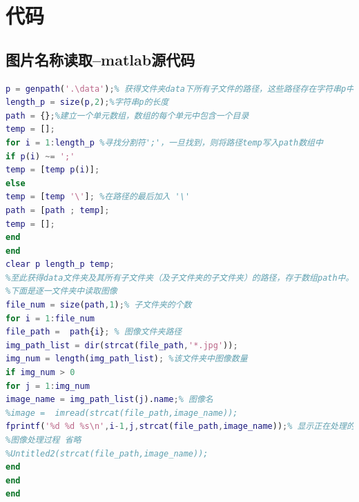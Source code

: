 \documentclass{whutmod}
\begin{document}
	\newpage
	\appendix %

\section{代码}
\subsection{图片名称读取--matlab源代码}
\begin{lstlisting}[language=matlab]
p = genpath('.\data');% 获得文件夹data下所有子文件的路径，这些路径存在字符串p中，以';'分割
length_p = size(p,2);%字符串p的长度
path = {};%建立一个单元数组，数组的每个单元中包含一个目录
temp = [];
for i = 1:length_p %寻找分割符';'，一旦找到，则将路径temp写入path数组中
if p(i) ~= ';'
temp = [temp p(i)];
else 
temp = [temp '\']; %在路径的最后加入 '\'
path = [path ; temp];
temp = [];
end
end  
clear p length_p temp;
%至此获得data文件夹及其所有子文件夹（及子文件夹的子文件夹）的路径，存于数组path中。
%下面是逐一文件夹中读取图像
file_num = size(path,1);% 子文件夹的个数
for i = 1:file_num
file_path =  path{i}; % 图像文件夹路径
img_path_list = dir(strcat(file_path,'*.jpg'));
img_num = length(img_path_list); %该文件夹中图像数量
if img_num > 0
for j = 1:img_num
image_name = img_path_list(j).name;% 图像名
%image =  imread(strcat(file_path,image_name));
fprintf('%d %d %s\n',i-1,j,strcat(file_path,image_name));% 显示正在处理的路径和图像名
%图像处理过程 省略
%Untitled2(strcat(file_path,image_name));
end
end
end
\end{lstlisting}
\end{document}
